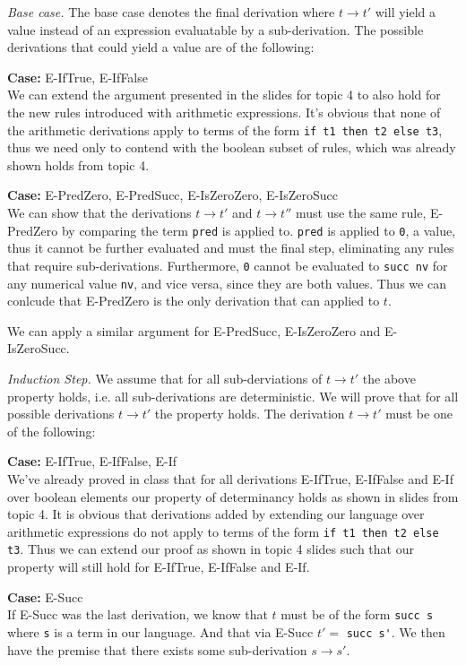 \documentclass[12pt, fleqn]{article}
\begin{document}
\medskip
\emph{Base case.} The base case denotes the final derivation where $t \rightarrow t'$ will yield a value instead
of an expression evaluatable by a sub-derivation. The possible derivations that could yield a value are of the following:

\medskip
\textbf{Case:} E-IfTrue, E-IfFalse\\
We can extend the argument presented in the slides for topic 4 to also hold for the new rules introduced with arithmetic
expressions. It's obvious that none of the arithmetic derivations apply to terms of the form \verb|if t1 then t2 else t3|, thus
we need only to contend with the boolean subset of rules, which was already shown holds from topic 4.

\medskip
\textbf{Case:} E-PredZero, E-PredSucc, E-IsZeroZero, E-IsZeroSucc\\
We can show that the derivations $t \rightarrow t'$ and $t \rightarrow t''$ must use the same rule, E-PredZero by comparing
the term \verb|pred| is applied to. \verb|pred| is applied to \verb|0|, a value, thus it cannot be further evaluated and must the
final step, eliminating any rules that require sub-derivations. Furthermore, \verb|0| cannot be evaluated to \verb|succ nv| for any
numerical value \verb|nv|, and vice versa, since they are both values. Thus we can conlcude that E-PredZero is the only derivation that can
applied to $t$.

We can apply a similar argument for E-PredSucc, E-IsZeroZero and E-IsZeroSucc.

\medskip
\emph{Induction Step.} We assume that for all sub-derviations of $t \rightarrow t'$ the above property holds, i.e.
all sub-derivations are deterministic. We will prove that for all possible derivations $t \rightarrow t'$ the property holds.
The derivation $t \rightarrow t'$ must be one of the following:

\medskip
\textbf{Case:} E-IfTrue, E-IfFalse, E-If\\
We've already proved in class that for all derivations E-IfTrue, E-IfFalse and E-If over 
boolean elements our property of determinancy holds as shown in slides from topic 4. It is obvious
that derivations added by extending our language over arithmetic expressions do not apply to terms of the form \verb|if t1 then t2 else t3|. 
Thus we can extend our proof as shown in topic 4 slides such that our property will still hold for E-IfTrue, E-IfFalse and E-If.

\medskip
\textbf{Case:} E-Succ\\
If E-Succ was the last derivation, we know that $t$ must be of the form \verb|succ s| where \verb|s| is a term in our language.
And that via E-Succ $t' =$ \verb|succ s'|.
We then have the premise that there exists some sub-derivation $s \rightarrow s'$. 
\end{document}
